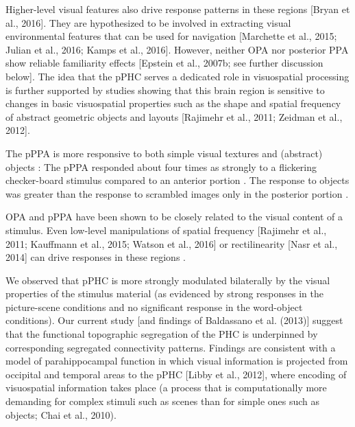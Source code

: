 \documentclass[english]{article}
\begin{document}
Higher-level visual features also drive response patterns in these regions
[Bryan et al., 2016]. They are hypothesized to be involved in extracting visual
environmental features that can be used for navigation [Marchette et al., 2015;
Julian et al., 2016; Kamps et al., 2016]. However, neither OPA nor posterior PPA
show reliable familiarity effects [Epstein et al., 2007b; see further discussion
below]\citep{baldassano2016two}.
%
The idea that the pPHC serves a dedicated role in visuospatial processing is
further supported by studies showing that this brain region is sensitive to
changes in basic visuospatial properties such as the shape and spatial frequency
of abstract geometric objects and layouts [Rajimehr et al., 2011; Zeidman et
al., 2012]\citep{baumann2016functional}.


The pPPA is more responsive to both simple visual textures and (abstract)
objects \citep{arcaro2009retinotopic, baldassano2013differential}:
%
The pPPA responded about four times as strongly to a
flickering checker-board stimulus compared to an anterior portion
\citep{arcaro2009retinotopic}.
%
The response to objects was greater than the
response to scrambled images only in the posterior portion
\citep{arcaro2009retinotopic}.

OPA and pPPA have been shown to be closely related to the visual content of a
stimulus. Even low-level manipulations of spatial frequency [Rajimehr et al.,
2011; Kauffmann et al., 2015; Watson et al., 2016] or rectilinearity [Nasr et
al., 2014] can drive responses in these regions \citep{baldassano2016two}.

We observed that pPHC is more strongly modulated bilaterally by the visual
properties of the stimulus material (as evidenced by strong responses in the
picture-scene conditions and no significant response in the word-object
conditions)\citep{baumann2016functional}.
%
Our current study [and findings of Baldassano et al. (2013)] suggest that the
functional topographic segregation of the PHC is underpinned by corresponding
segregated connectivity patterns. Findings are consistent with a model of
parahippocampal function in which visual information is projected from occipital
and temporal areas to the pPHC [Libby et al., 2012], where encoding of
visuospatial information takes place (a process that is computationally more
demanding for complex stimuli such as scenes than for simple ones such as
objects; Chai et al., 2010)\citep{baumann2016functional}.
\end{document}
